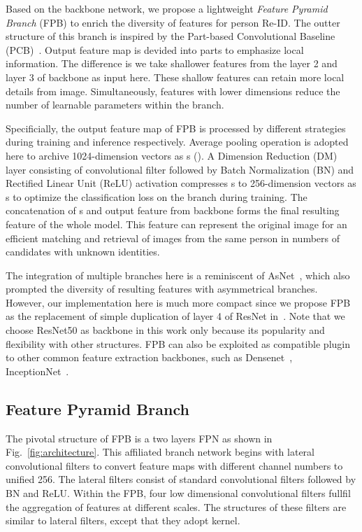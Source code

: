 \documentclass[journal]{IEEEtran}
\begin{document}
Based on the backbone network, we propose a lightweight \textit{Feature Pyramid Branch} (FPB) to enrich the diversity of features for person Re-ID.
The outter structure of this branch is inspired by the Part-based Convolutional Baseline (PCB)~\cite{sun2018beyond}.
Output feature map is devided into parts to emphasize local information.
The difference is we take shallower features from the layer 2 and layer 3 of backbone as input here.
These shallow features can retain more local details from image.
Simultaneously, features with lower dimensions reduce the number of learnable parameters within the branch.

Specificially, the output feature map of FPB is processed by different strategies during training and inference respectively.
Average pooling operation is adopted here to archive  1024-dimension vectors as s ().
A Dimension Reduction (DM) layer consisting of convolutional filter followed by Batch Normalization (BN) and Rectified Linear Unit (ReLU) activation compresses s to  256-dimension vectors as s to optimize the classification loss on the branch during training.
The concatenation of s and output feature from backbone forms the final resulting feature of the whole model.
This feature can represent the original image for an efficient matching and retrieval of images from the same person in numbers of candidates with unknown identities.

The integration of multiple branches here is a reminiscent of AsNet~\cite{9094042}, which also prompted the diversity of resulting features with asymmetrical branches.
However, our implementation here is much more compact since we propose FPB as the replacement of simple duplication of layer 4 of ResNet in~\cite{9094042}.
Note that we choose ResNet50 as backbone in this work only because its popularity and flexibility with other structures. 
FPB can also be exploited as compatible plugin to other common feature extraction backbones, such as Densenet~\cite{8099726}, InceptionNet~\cite{szegedy2017inception}.

\subsection{Feature Pyramid Branch}
The pivotal structure of FPB is a two layers FPN as shown in Fig.~\ref{fig:architecture}.
This affiliated branch network begins with lateral convolutional filters to convert feature maps with different channel numbers to unified 256.
The lateral filters consist of standard  convolutional filters followed by BN and ReLU.
Within the FPB, four low dimensional convolutional filters fullfil the aggregation of features at different scales.
The structures of these filters are similar to lateral filters, except that they adopt  kernel.
\end{document}
